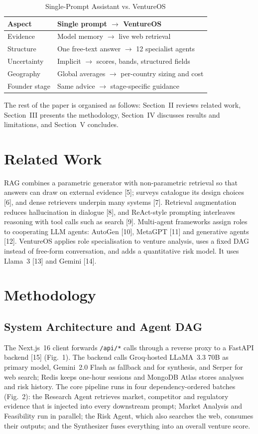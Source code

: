 \begin{table}[!t]
\caption{Single-Prompt Assistant vs. VentureOS}
\centering\footnotesize
\begin{tabularx}{\columnwidth}{@{}l>{\raggedright\arraybackslash}X@{}}\toprule
\textbf{Aspect} & \textbf{Single prompt $\rightarrow$ VentureOS}\\\midrule
Evidence & Model memory $\rightarrow$ live web retrieval\\
Structure & One free-text answer $\rightarrow$ 12 specialist agents\\
Uncertainty & Implicit $\rightarrow$ scores, bands, structured fields\\
Geography & Global averages $\rightarrow$ per-country sizing and cost\\
Founder stage & Same advice $\rightarrow$ stage-specific guidance\\\bottomrule
\end{tabularx}
\end{table}

The rest of the paper is organised as follows: Section~II reviews related work, Section~III presents the methodology, Section~IV discusses results and limitations, and Section~V concludes.

\section{Related Work}
RAG combines a parametric generator with non-parametric retrieval so that answers can draw on external evidence [5]; surveys catalogue its design choices [6], and dense retrievers underpin many systems [7]. Retrieval augmentation reduces hallucination in dialogue [8], and ReAct-style prompting interleaves reasoning with tool calls such as search [9]. Multi-agent frameworks assign roles to cooperating LLM agents: AutoGen [10], MetaGPT [11] and generative agents [12]. VentureOS applies role specialisation to venture analysis, uses a fixed DAG instead of free-form conversation, and adds a quantitative risk model. It uses Llama~3 [13] and Gemini [14].

\section{Methodology}
\subsection{System Architecture and Agent DAG}
The Next.js~16 client forwards \texttt{/api/*} calls through a reverse proxy to a FastAPI backend [15] (Fig.~1). The backend calls Groq-hosted LLaMA~3.3 70B as primary model, Gemini~2.0 Flash as fallback and for synthesis, and Serper for web search; Redis keeps one-hour sessions and MongoDB Atlas stores analyses and risk history. The core pipeline runs in four dependency-ordered batches (Fig.~2): the Research Agent retrieves market, competitor and regulatory evidence that is injected into every downstream prompt; Market Analysis and Feasibility run in parallel; the Risk Agent, which also searches the web, consumes their outputs; and the Synthesizer fuses everything into an overall venture score.

